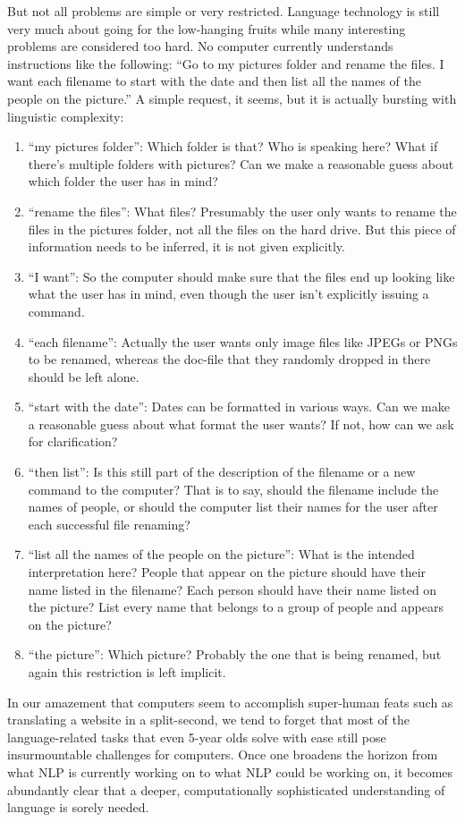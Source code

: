 But not all problems are simple or very restricted.
Language technology is still very much about going for the low-hanging fruits while many interesting problems are considered too hard.
No computer currently understands instructions like the following: ``Go to my pictures folder and rename the files. I want each filename to start with the date and then list all the names of the people on the picture.''
A simple request, it seems, but it is actually bursting with linguistic complexity:
%
\begin{enumerate}
    \item ``my pictures folder'':
            Which folder is that?
            Who is speaking here?
            What if there's multiple folders with pictures?
            Can we make a reasonable guess about which folder the user has in mind?
    \item ``rename the files'':
            What files?
            Presumably the user only wants to rename the files in the pictures folder, not all the files on the hard drive.
            But this piece of information needs to be inferred, it is not given explicitly.
    \item ``I want'':
            So the computer should make sure that the files end up looking like what the user has in mind, even though the user isn't explicitly issuing a command.
    \item ``each filename'':
            Actually the user wants only image files like JPEGs or PNGs to be renamed, whereas the doc-file that they randomly dropped in there should be left alone.
    \item ``start with the date'':
            Dates can be formatted in various ways.
            Can we make a reasonable guess about what format the user wants?
            If not, how can we ask for clarification?
    \item ``then list'':
            Is this still part of the description of the filename or a new command to the computer?
            That is to say, should the filename include the names of people, or should the computer list their names for the user after each successful file renaming?
    \item ``list all the names of the people on the picture'':
            What is the intended interpretation here?
            People that appear on the picture should have their name listed in the filename?
            Each person should have their name listed on the picture?
            List every name that belongs to a group of people and appears on the picture?
    \item ``the picture'':
            Which picture?
            Probably the one that is being renamed, but again this restriction is left implicit.
\end{enumerate}
%
In our amazement that computers seem to accomplish super-human feats such as translating a website in a split-second, we tend to forget that most of the language-related tasks that even 5-year olds solve with ease still pose insurmountable challenges for computers.
Once one broadens the horizon from what NLP is currently working on to what NLP could be working on, it becomes abundantly clear that a deeper, computationally sophisticated understanding of language is sorely needed.

